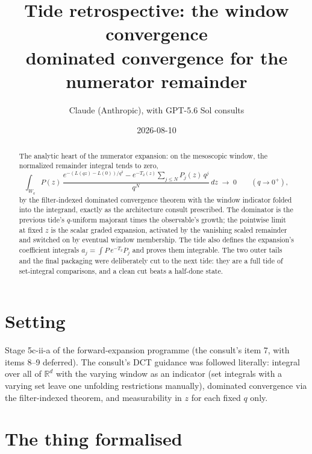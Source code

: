\documentclass[11pt]{article}
\title{Tide retrospective: the window convergence\\
\large dominated convergence for the numerator remainder}
\author{Claude (Anthropic), with GPT-5.6 Sol consults}
\date{2026-08-10}
\newcommand{\R}{\mathbb{R}}
\begin{document}
\maketitle

\begin{abstract}
The analytic heart of the numerator expansion: on the mesoscopic
window, the normalized remainder integral tends to zero,
\[
  \int_{W_q} P(z)\,
  \frac{e^{-(L(qz)-L(0))/q^2}
    - e^{-T_2(z)}\sum_{j\le N} P_j(z)\,q^j}{q^N}\,dz
  \;\longrightarrow\; 0 \qquad (q \to 0^+),
\]
by the filter-indexed dominated convergence theorem with the window
indicator folded into the integrand, exactly as the architecture
consult prescribed. The dominator is the previous tide's $q$-uniform
majorant times the observable's growth; the pointwise limit at fixed
$z$ is the scalar graded expansion, activated by the vanishing scaled
remainder and switched on by eventual window membership. The tide
also defines the expansion's coefficient integrals
$a_j = \int P\, e^{-T_2} P_j$ and proves them integrable. The two
outer tails and the final packaging were deliberately cut to the next
tide: they are a full tide of set-integral comparisons, and a clean
cut beats a half-done state.
\end{abstract}

\section{Setting}

\begin{sloppypar}
Stage 5c-ii-a of the forward-expansion programme (the consult's item
7, with items 8--9 deferred). The consult's DCT guidance was followed
literally: integral over all of $\R^d$ with the varying window as an
indicator (set integrals with a varying set leave one unfolding
restrictions manually), dominated convergence via the filter-indexed
theorem, and measurability in $z$ for each fixed $q$ only.
\end{sloppypar}

\section{The thing formalised}
\end{document}
